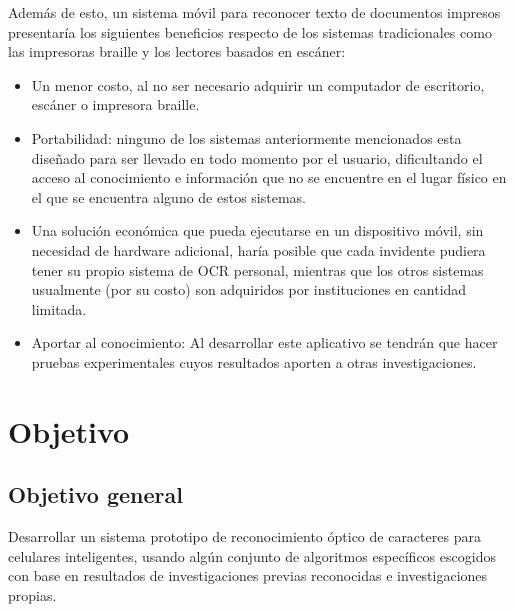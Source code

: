 \documentclass[a4paper, 11pt, oneside]{article}
\begin{document}
	Además de esto, un sistema móvil para reconocer texto de documentos impresos presentaría los siguientes beneficios respecto de los sistemas tradicionales como las impresoras braille y los lectores basados en escáner:
	\begin{itemize}
	\item Un menor costo, al no ser necesario adquirir un computador de escritorio, escáner o impresora braille.

	\item Portabilidad: ninguno de los sistemas anteriormente mencionados esta diseñado para ser llevado en todo momento por el usuario, dificultando el acceso al conocimiento e información que no se encuentre en el lugar físico en el que se encuentra alguno de estos sistemas.
	
	\item Una solución económica que pueda ejecutarse en un dispositivo móvil, sin necesidad de hardware adicional, haría posible que cada invidente pudiera tener su propio sistema de OCR personal, mientras que los otros sistemas usualmente (por su costo) son adquiridos por instituciones en cantidad limitada.

	\item Aportar al conocimiento: Al desarrollar este aplicativo se tendrán que hacer pruebas experimentales cuyos resultados aporten a otras investigaciones.
	\end{itemize}
	\clearpage

	\section{Objetivo}
	\subsection{Objetivo general}
	Desarrollar un sistema prototipo de reconocimiento óptico de caracteres para celulares inteligentes, usando algún conjunto de algoritmos específicos escogidos con base en resultados de investigaciones previas reconocidas e investigaciones propias.
\end{document}
